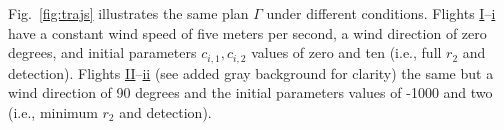 \documentclass[letterpaper,10pt,journal,twoside]{IEEEtran}
\newcommand{\figpath}{./figures}
\theoremstyle{definition}
\begin{document}
%  
%  
%  


Fig.~\ref{fig:trajs} illustrates the same plan $\Gamma$ under different conditions. Flights \hyperref[fig:trajs-I-static]{I}--\hyperref[fig:trajs-dyn-i]{i} have a constant wind speed of five meters per second, a wind direction of zero degrees, and initial parameters $c_{i,1},c_{i,2}$ values of zero and ten (i.e., full $r_2$ and detection). Flights \hyperref[fig:trajs-II-static]{II}--\hyperref[fig:trajs-dyn-ii]{ii} (see added gray background for clarity) the same but a wind direction of 90 degrees and the initial parameters values of -1000 and two (i.e., minimum $r_2$ and detection). 
\end{document}
